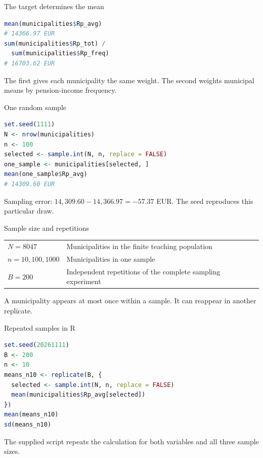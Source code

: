 \begin{frame}[fragile]{The target determines the mean}
\begin{lstlisting}[language=R]
mean(municipalities$Rp_avg)
# 14366.97 EUR
sum(municipalities$Rp_tot) /
  sum(municipalities$Rp_freq)
# 16703.62 EUR
\end{lstlisting}
The first gives each municipality the same weight. The second weights municipal means by pension-income frequency.
\end{frame}

\begin{frame}[fragile]{One random sample}
\begin{lstlisting}[language=R]
set.seed(1111)
N <- nrow(municipalities)
n <- 100
selected <- sample.int(N, n, replace = FALSE)
one_sample <- municipalities[selected, ]
mean(one_sample$Rp_avg)
# 14309.60 EUR
\end{lstlisting}
Sampling error: $14,309.60-14,366.97=-57.37$ EUR. The seed reproduces this particular draw.
\end{frame}

\begin{frame}{Sample size and repetitions}
\begin{tabular}{lp{}}\toprule
$N=8047$ & Municipalities in the finite teaching population\\[4mm]
$n=10,100,1000$ & Municipalities in one sample\\[4mm]
$B=200$ & Independent repetitions of the complete sampling experiment\\\bottomrule
\end{tabular}\par\vspace{4mm}A municipality appears at most once within a sample. It can reappear in another replicate.
\end{frame}

\begin{frame}[fragile]{Repeated samples in R}
\begin{lstlisting}[language=R]
set.seed(20261111)
B <- 200
n <- 10
means_n10 <- replicate(B, {
  selected <- sample.int(N, n, replace = FALSE)
  mean(municipalities$Rp_avg[selected])
})
mean(means_n10)
sd(means_n10)
\end{lstlisting}
The supplied script repeats the calculation for both variables and all three sample sizes.
\end{frame}


